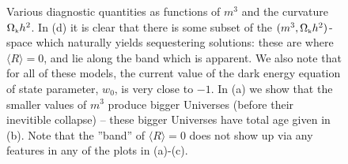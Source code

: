 \documentclass[amsmath,amssymb,12pt,eqsecnum]{revtex4}
\begin{document}
\begin{figure}[!t]
\begin{center}
      \end{center}
\caption{ Various diagnostic quantities as functions of $m^3$ and the curvature ${\Omega}_{\scriptscriptstyle{\textrm{k}}}h^2$. In (d) it is clear that there is some subset of the $(m^3, {\Omega}_{\scriptscriptstyle{\textrm{k}}}h^2)$-space which naturally yields sequestering solutions: these are where $\langle R\rangle = 0$, and lie along the band which is apparent. We also note that for all of these models, the current value of the dark energy equation of state parameter, $w_0$, is very close to $-1$. In (a) we show that the smaller values of $m^3$ produce bigger Universes (before their inevitible collapse) -- these bigger Universes have total age given in (b). Note that the ''band'' of $\langle R\rangle = 0$ does not show up via any features in any of the plots in (a)-(c).}\label{fig:plots1}
\end{figure}



\end{document}
